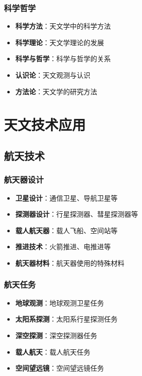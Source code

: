 \documentclass[12pt,UTF8]{ctexbook}
\begin{document}
\section{科学哲学}

\begin{itemize}
  \item \textbf{科学方法}：天文学中的科学方法
  \item \textbf{科学理论}：天文学理论的发展
  \item \textbf{科学与哲学}：科学与哲学的关系
  \item \textbf{认识论}：天文观测与认识
  \item \textbf{方法论}：天文学的研究方法
\end{itemize}

\part{天文技术应用}

\chapter{航天技术}
\section{航天器设计}

\begin{itemize}
  \item \textbf{卫星设计}：通信卫星、导航卫星等
  \item \textbf{探测器设计}：行星探测器、彗星探测器等
  \item \textbf{载人航天器}：载人飞船、空间站等
  \item \textbf{推进技术}：火箭推进、电推进等
  \item \textbf{航天器材料}：航天器使用的特殊材料
\end{itemize}

\section{航天任务}

\begin{itemize}
  \item \textbf{地球观测}：地球观测卫星任务
  \item \textbf{太阳系探测}：太阳系行星探测任务
  \item \textbf{深空探测}：深空探测器任务
  \item \textbf{载人航天}：载人航天任务
  \item \textbf{空间望远镜}：空间望远镜任务
\end{itemize}
\end{document}
